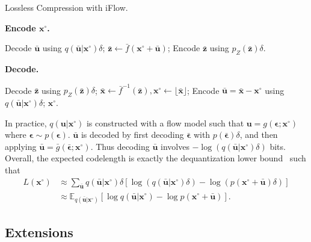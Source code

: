 \documentclass{article}
\newcommand{\qv}[1]{\bar{\mathbf{#1}}}
\begin{document}
\begin{algorithm}[h]
\small
\caption{Lossless Compression with iFlow.}
\begin{multicols}{2} 
\textbf{Encode $\mathbf{x}^{\circ}$.} 

\begin{algorithmic}[1]
\STATE Decode $\qv{u}$ using $q(\qv{u} | \mathbf{x}^\circ) \delta$;
\STATE $\qv{z} \gets \bar{f} (\mathbf{x}^\circ + \qv{u})$;
\STATE Encode $\qv{z}$ using $p_Z (\qv{z}) \delta$.
\end{algorithmic}

\textbf{Decode.} 

\begin{algorithmic}[1]
\STATE Decode $\qv{z}$ using $p_Z (\qv{z}) \delta$;
\STATE $\qv{x} \gets \bar{f}^{-1} (\qv{z}),  \mathbf{x}^\circ \gets \lfloor \qv{x} \rfloor$;
\STATE Encode $\qv{u} = \qv{x} - \mathbf{x}^\circ$ using $q(\qv{u} | \mathbf{x}^\circ) \delta$;
\RETURN $\mathbf{x}^\circ$.
\end{algorithmic}
\end{multicols}
\vspace{-8pt}
\label{alg:compression}
\end{algorithm}

In practice, $q(\mathbf{u} | \mathbf{x}^\circ)$ is constructed with a flow model such that $\mathbf{u} = g(\bm{\epsilon}; \mathbf{x}^\circ)$ where $ \bm{\epsilon} \sim p(\bm{\epsilon})$. $\qv{u}$ is decoded by first decoding $\bar{\bm{\epsilon}}$ with $p(\bar{\bm{\epsilon}}) \delta$, and then applying $\qv{u} = \bar{g} (\bar{\bm{\epsilon}}; \mathbf{x}^\circ)$. Thus decoding $\qv{u}$ involves $-\log (q(\qv{u} | \mathbf{x}^\circ) \delta)$ bits.
Overall, the expected codelength is exactly the dequantization lower bound~\cite{hoogeboom2020learning} such that
\begin{equation}
\begin{split}
    L(\mathbf{x}^\circ) &\approx \sum_{\qv{u}} q(\qv{u} | \mathbf{x}^\circ) \delta [\log (q(\qv{u} | \mathbf{x}^\circ) \delta) - \log (p(\mathbf{x}^\circ + \qv{u}) \delta) ] \\
    &\approx \mathbb{E}_{q(\qv{u} | \mathbf{x}^\circ)} [\log q(\qv{u} | \mathbf{x}^\circ) - \log p(\mathbf{x}^\circ + \qv{u})].
\end{split}
\end{equation}

\subsection{Extensions}
\label{sec:iflow_extension}
\end{document}
